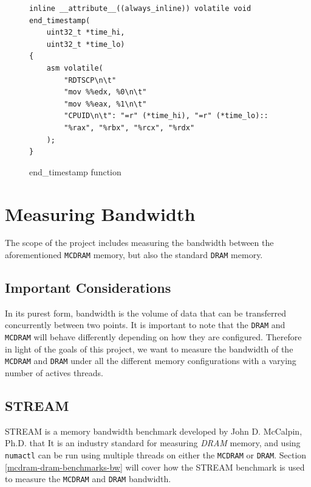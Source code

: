 \documentclass[bsc,frontabs,twoside,singlespacing,parskip,deptreport]{infthesis}     %
\begin{document}
\begin{figure}[h!]
    \centering
    \begin{verbatim}
inline __attribute__((always_inline)) volatile void end_timestamp(
    uint32_t *time_hi,
    uint32_t *time_lo)
{
    asm volatile(
        "RDTSCP\n\t"
        "mov %%edx, %0\n\t"
        "mov %%eax, %1\n\t"
        "CPUID\n\t": "=r" (*time_hi), "=r" (*time_lo)::
        "%rax", "%rbx", "%rcx", "%rdx"
    );
}
    \end{verbatim}
    \caption{end\_timestamp function}
    \label{fig:endtimestamp-code}
\end{figure}

\newpage
\section{Measuring Bandwidth}\label{measuring-bandwidth}
The scope of the project includes measuring the bandwidth between the aforementioned \texttt{MCDRAM} memory, but also the standard \texttt{DRAM} memory.

\subsection{Important Considerations}\label{bandwidth_considerations}
In its purest form, bandwidth is the volume of data that can be transferred concurrently between two points. It is important to note that the \texttt{DRAM} and \texttt{MCDRAM} will behave differently depending on how they are configured. Therefore in light of the goals of this project, we want to measure the bandwidth of the \texttt{MCDRAM} and \texttt{DRAM} under all the different memory configurations with a varying number of actives threads.

\subsection{STREAM \cite{McCalpin1995}}
STREAM is a memory bandwidth benchmark developed by John D. McCalpin, Ph.D. that \cite{STREAM_FAQ} It is an industry standard for measuring \textit{DRAM} memory, and using \texttt{numactl}\cite{numactl_repo}\cite{numactl_man} can be run using multiple threads on either the \texttt{MCDRAM} or \texttt{DRAM}. Section \ref{mcdram-dram-benchmarks-bw} will cover how the STREAM benchmark is used to measure the \texttt{MCDRAM} and \texttt{DRAM} bandwidth.
\end{document}
